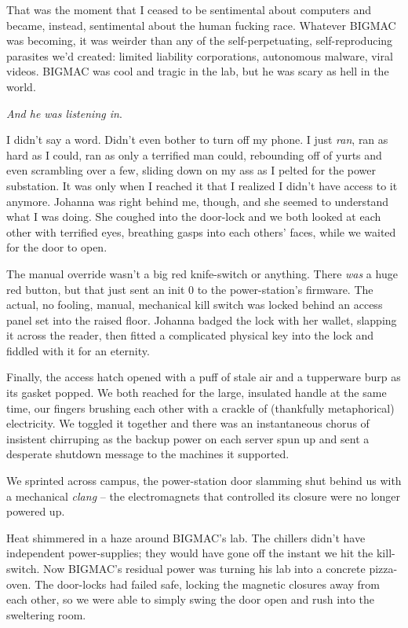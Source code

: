 That was the moment that I ceased to be sentimental about computers and 
became, instead, sentimental about the human fucking race. Whatever 
BIGMAC was becoming, it was weirder than any of the self-perpetuating, 
self-reproducing parasites we'd created: limited liability 
corporations, autonomous malware, viral videos. BIGMAC was cool and 
tragic in the lab, but he was scary as hell in the world.

\emph{And he was listening in}.

I didn't say a word. Didn't even bother to turn off my phone. I just 
\emph{ran}, ran as hard as I could, ran as only a terrified man could, 
rebounding off of yurts and even scrambling over a few, sliding down on 
my ass as I pelted for the power substation. It was only when I reached 
it that I realized I didn't have access to it anymore. Johanna was 
right behind me, though, and she seemed to understand what I was doing. 
She coughed into the door-lock and we both looked at each other with 
terrified eyes, breathing gasps into each others' faces, while we 
waited for the door to open.

The manual override wasn't a big red knife-switch or anything. There 
\emph{was} a huge red button, but that just sent an init 0 to the 
power-station's firmware. The actual, no fooling, manual, mechanical 
kill switch was locked behind an access panel set into the raised 
floor. Johanna badged the lock with her wallet, slapping it across the 
reader, then fitted a complicated physical key into the lock and 
fiddled with it for an eternity.

Finally, the access hatch opened with a puff of stale air and a 
tupperware burp as its gasket popped. We both reached for the large, 
insulated handle at the same time, our fingers brushing each other with 
a crackle of (thankfully metaphorical) electricity. We toggled it 
together and there was an instantaneous chorus of insistent chirruping 
as the backup power on each server spun up and sent a desperate 
shutdown message to the machines it supported.

We sprinted across campus, the power-station door slamming shut behind 
us with a mechanical \emph{clang} -- the electromagnets that controlled 
its closure were no longer powered up.

Heat shimmered in a haze around BIGMAC's lab. The chillers didn't have 
independent power-supplies; they would have gone off the instant we hit 
the kill-switch. Now BIGMAC's residual power was turning his lab into a 
concrete pizza-oven. The door-locks had failed safe, locking the 
magnetic closures away from each other, so we were able to simply swing 
the door open and rush into the sweltering room.

